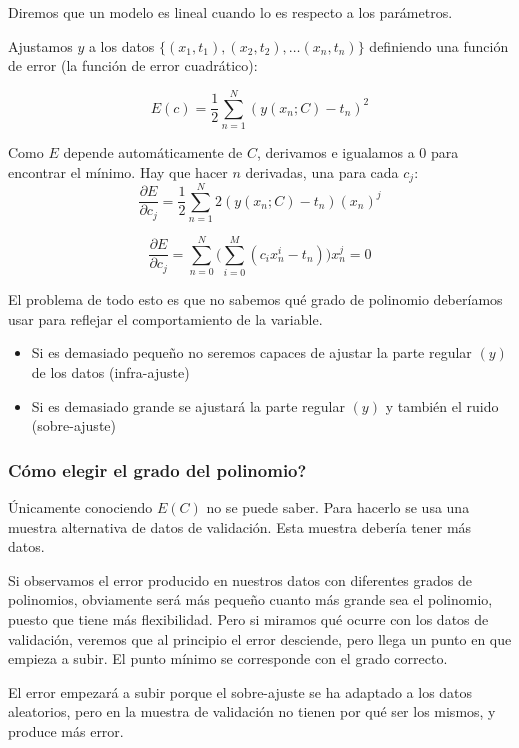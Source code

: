 \documentclass[a4paper,10pt]{article}
\begin{document}
Diremos que un modelo es lineal cuando lo es respecto a los parámetros.

Ajustamos $y$ a los datos $\{(x_1,t_1),(x_2,t_2), \dots (x_n, t_n)\}$ definiendo una función de error (la función de error cuadrático):

\begin{equation*}
E(c) = \frac{1}{2} \sum_{n = 1}^{N} (y(x_n;C) - t_n)^2
\end{equation*}

Como $E$ depende automáticamente de $C$, derivamos e igualamos a 0 para encontrar el mínimo. Hay que hacer $n$ derivadas, una para cada $c_j$:
\begin{equation*}
\frac{\partial E}{\partial c_j} = \frac{1}{2} \sum_{n = 1}^{N} 2(y(x_n;C) - t_n)(x_n)^j
\end{equation*}

\begin{equation*}
\frac{\partial E}{\partial c_j} = \sum_{n = 0}^{N} \Big(\sum_{i = 0}^{M} (c_ix_n^i - t_n) \Big) x_n^j = 0
\end{equation*}

El problema de todo esto es que no sabemos qué grado de polinomio deberíamos usar para reflejar el comportamiento de la variable.
\begin{itemize}
\item Si es demasiado pequeño no seremos capaces de ajustar la parte regular $(y)$ de los datos (infra-ajuste)
\item Si es demasiado grande se ajustará la parte regular $(y)$ y también el ruido (sobre-ajuste)
\end{itemize}

\subsubsection*{Cómo elegir el grado del polinomio?}
Únicamente conociendo $E(C)$ no se puede saber. Para hacerlo se usa una muestra alternativa de datos de validación. Esta muestra debería tener más datos.

Si observamos el error producido en nuestros datos con diferentes grados de polinomios, obviamente será más pequeño cuanto más grande sea el polinomio, puesto que tiene más flexibilidad. Pero si miramos qué ocurre con los datos de validación, veremos que al principio el error desciende, pero llega un punto en que empieza a subir. El punto mínimo se corresponde con el grado correcto.

El error empezará a subir porque el sobre-ajuste se ha adaptado a los datos aleatorios, pero en la muestra de validación no tienen por qué ser los mismos, y produce más error.
\end{document}
